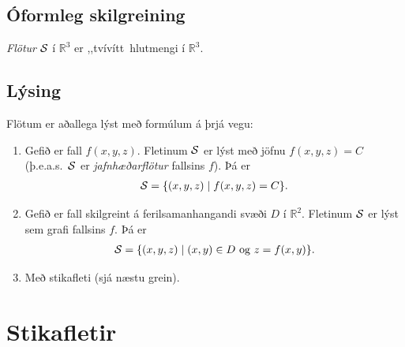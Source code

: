 \documentclass[a4paper,10pt,icelandic]{sphinxmanual}
\begin{document}
\subsection{Óformleg skilgreining}
\label{Kafli5:oformleg-skilgreining}
\textit{Flötur} \(\cal S\) í \({\mathbb  R}^3\) er ,,tvívítt hlutmengi í
\({\mathbb  R}^3\).


\subsection{Lýsing}
\label{Kafli5:lysing}
Flötum er aðallega lýst með formúlum á þrjá vegu:
\begin{enumerate}
\item {} 
Gefið er fall \(f(x,y,z)\). Fletinum \(\cal S\) er lýst með
jöfnu \(f(x,y,z)=C\) (þ.e.a.s. \(\cal S\) er \textit{jafnhæðarflötur}
fallsins \(f\)). Þá er
\begin{gather}
\begin{split}\displaystyle {\cal S}=\{(x,y,z)\mid f(x,y,z)=C\}.\end{split}\notag
\end{gather}
\item {} 
Gefið er fall skilgreint á ferilsamanhangandi svæði \(D\) í
\({\mathbb  R}^2\). Fletinum \(\cal S\) er lýst sem grafi
fallsins \(f\). Þá er
\begin{gather}
\begin{split}\displaystyle {\cal S}=\{(x,y,z)\mid (x,y)\in D\mbox{ og } z=f(x,y)\}.\end{split}\notag
\end{gather}
\item {} 
Með stikafleti (sjá næstu grein).

\end{enumerate}


\section{Stikafletir}
\label{Kafli5:index-5}\label{Kafli5:stikafletir}
\end{document}
